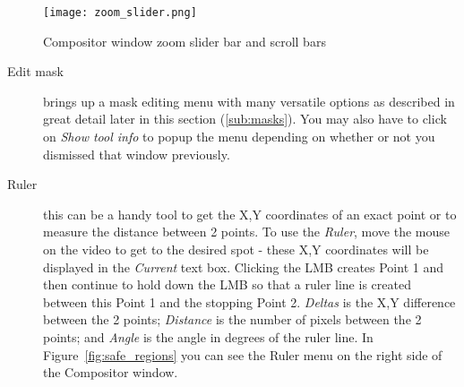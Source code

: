 \begin{figure}[htpb]
    \centering
    \texttt{[image: zoom\_slider.png]}
    \caption{Compositor window zoom slider bar and scroll bars}
    \label{fig:zoom_slider}
\end{figure}
\begin{description}
    \item[Edit mask] brings up a mask editing menu with many versatile options as
described in great detail later in this section (\ref{sub:masks}). You may also have to click on
\textit{Show tool info} to popup the menu depending on whether or not you dismissed that window previously.
    \item[Ruler] this can be a handy tool to get the X,Y coordinates of an exact point or to 
measure the distance between 2 points. To use the \textit{Ruler}, move the mouse on the video to
get to the desired spot - these X,Y coordinates will be displayed in the \textit{Current} text
box.  Clicking the LMB creates Point 1 and then continue to hold down the LMB so that a ruler line is created between
this Point 1 and the stopping Point 2.  \textit{Deltas} is the X,Y difference between the 2 points;
\textit{Distance} is the number of pixels between the 2 points; and \textit{Angle} is the angle in degrees of the ruler line.  
In Figure~\ref{fig:safe_regions} you can see the Ruler menu on the right side of the Compositor window.


\end{description}
